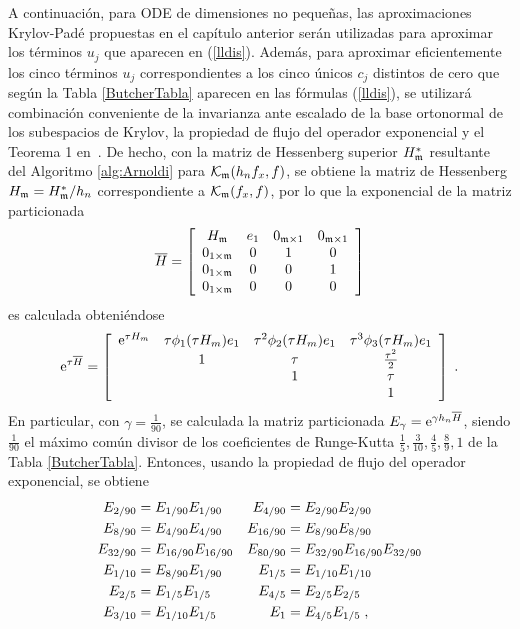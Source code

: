 A continuación, para ODE de dimensiones no pequeñas, las aproximaciones Krylov-Padé propuestas en el capítulo anterior serán utilizadas para aproximar los términos $u_j$ que aparecen en (\ref{lldis}). Además, para aproximar eficientemente los cinco términos $u_j$ correspondientes a los cinco únicos $c_j$ distintos de cero que según la Tabla \ref{ButcherTabla} aparecen en las fórmulas (\ref{lldis}), se utilizará combinación conveniente de la invarianza ante escalado de la base ortonormal de los subespacios de Krylov, la propiedad de flujo del operador exponencial y el Teorema 1 en~\cite{sidje1998expokit}. De hecho, con la matriz de Hessenberg superior $H^*_{\mathfrak{m}}$ resultante del Algoritmo \ref{alg:Arnoldi} para $\mathcal{K}_{\mathfrak{m}}(h_nf_x,f)$, se obtiene la matriz de Hessenberg $H_{\mathfrak{m}}=H^*_{\mathfrak{m}}/h_n$ correspondiente a $\mathcal{K}_{\mathfrak{m}}(f_x,f)$, por lo que la exponencial de la matriz particionada
\begin{equation}
    \overline{H} = \left[\begin{array}{cccc}
    H_{\mathfrak{m}} & e_1 & 0_{\mathfrak{m}\times 1} & 0_{\mathfrak{m}\times 1}\\
    0_{1\times\mathfrak{m}} & 0 & 1 & 0\\
    0_{1\times\mathfrak{m}} & 0 & 0 & 1\\
    0_{1\times\mathfrak{m}} & 0 & 0 & 0
    \end{array}\right] \label{hhat}
\end{equation}
es calculada obteniéndose
\begin{equation}
    \mathrm{e}^{\tau\overline{H}} = \left[\begin{array}{cccc}
    \mathrm{e}^{\tau H_m} & \tau\phi_1(\tau H_m)e_1 & \tau^{2}\phi_2(\tau H_m)e_1 &
    \tau^{3}\phi_3(\tau H_m)e_1 \\
    & 1 & \tau & \frac{\tau^{2}}{2}\\
    &  & 1 & \tau \\
    &   &   & 1 \\
    \end{array}\right]\;. \label{phi_hhat}
\end{equation}
En particular, con $\gamma=\frac{1}{90}$, se calculada la matriz particionada $E_\gamma=\mathrm{e}^{\gamma h_n\overline{H}}$, siendo $\frac{1}{ 90}$ el máximo común divisor de los coeficientes de Runge-Kutta $\frac{1}{5},\frac{3}{10},\frac{4}{5},\frac{8}{9} ,1$ de la Tabla \ref{ButcherTabla}. Entonces, usando la propiedad de flujo del operador exponencial, se obtiene
\begin{align}
    E_{2/90}& =E_{1/90}E_{1/90} & E_{4/90}& =E_{2/90}E_{2/90}  \notag \\
    E_{8/90}& =E_{4/90}E_{4/90} & E_{16/90}& =E_{8/90}E_{8/90}  \notag \\
    E_{32/90}& =E_{16/90}E_{16/90} & E_{80/90}& =E_{32/90}E_{16/90}E_{32/90}
    \label{flow} \\
    E_{1/10}& =E_{8/90}E_{1/90} & E_{1/5}& =E_{1/10}E_{1/10}  \notag \\
    E_{2/5}& =E_{1/5}E_{1/5} & E_{4/5}& =E_{2/5}E_{2/5}  \notag \\
    E_{3/10}& =E_{1/10}E_{1/5} & E_{1}& =E_{4/5}E_{1/5}\;,  \notag
\end{align}

